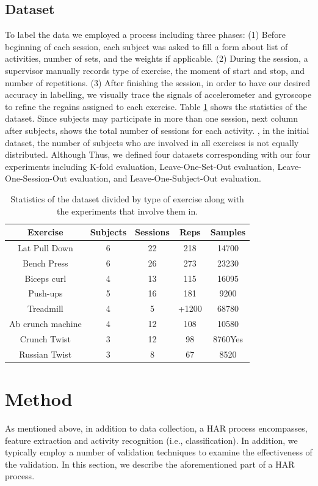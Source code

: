 \documentclass[journal,article,submit,moreauthors,pdftex]{Definitions/mdpi}
\begin{document}
\subsection{Dataset}
To label the data we employed a process including three phases: (1) Before beginning of each session, each subject was asked to fill a form about list of activities, number of sets, and the weights if applicable. (2) During the session, a supervisor manually records type of exercise, the moment of start and stop, and number of repetitions. (3) After finishing the session, in order to have our desired accuracy in labelling, we visually trace the signals of accelerometer and gyroscope to refine the regains assigned to each exercise.
Table \ref{dataset_statistics} shows the statistics of the dataset. Since subjects may participate in more than one session, next column after subjects, shows the total number of sessions for each activity.  , in the initial dataset, the number of subjects who are involved in all exercises is not equally distributed. Although  Thus, we defined four datasets corresponding with our four experiments including K-fold evaluation, Leave-One-Set-Out evaluation, Leave-One-Session-Out evaluation, and Leave-One-Subject-Out evaluation.
\begin{table}[H]
	\caption{Statistics of the dataset divided by type of exercise along with the experiments that involve them in.}
	\centering
	\begin{tabular}{ccccc}
		\toprule
		\textbf{Exercise} & \textbf{Subjects} & \textbf{Sessions}	 & \textbf{Reps} & \textbf{Samples}  \\
		\midrule		
		Lat Pull Down& 6& 22& 218& 14700\\
		Bench Press	& 6& 26& 273& 23230\\
		Biceps curl	& 4& 13& 115& 16095\\
		Push-ups & 5& 16& 181& 9200\\
		Treadmill& 4& 5& +1200 & 68780\\
		Ab crunch machine& 4& 12& 108 & 10580\\
		Crunch Twist &  3& 12& 98& 8760Yes\\
		Russian Twist & 3& 8& 67& 8520\\
		\bottomrule
	\end{tabular}
	\label{dataset_statistics}
\end{table}


\section{Method}
As mentioned above, in addition to data collection, a HAR process encompasses, feature extraction and activity recognition (i.e., classification). In addition, we typically employ a number of validation techniques to examine the effectiveness of the validation. In this section, we describe the aforementioned part of a HAR process.
\end{document}

